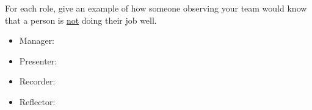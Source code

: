 \Q For each role, give an example of how someone observing your team would know that a person is \underline{not} doing their job well.

\begin{itemize}

\item Manager:
\hfill {}

\item Presenter:
\hfill {}

\item Recorder:
\hfill {}

\item Reflector:
\hfill {}

\end{itemize}
